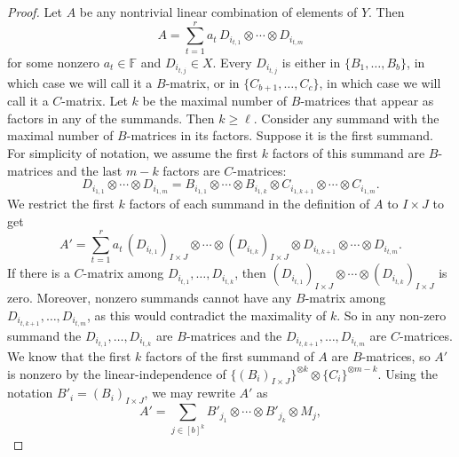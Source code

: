 \documentclass{daj}
\newcommand{\FF}{\mathbb{F}}
\begin{document}
%
%
%
%
%
%

%
\begin{proof}
    Let $A$ be any nontrivial linear combination of elements of $Y$.
    Then
    \[
    A=\sum_{t=1}^r a_t\, D_{i_{t,1}}\otimes\cdots\otimes D_{i_{t,m}}
    \]
    for some nonzero $a_t \in \FF$ and $D_{i_{t, j}} \in X$. Every $D_{i_{t, j}}$ is either in $\{B_1, \ldots, B_b\}$, in which case we will call it a $B$-matrix, or in $\{C_{b+1}, \ldots, C_c\}$, in which case we will call it a $C$-matrix.
    Let $k$ be the maximal number of $B$-matrices that appear as factors in any of the summands. Then $k\geq \ell$. 
    Consider any summand with the maximal number of $B$-matrices in its factors. Suppose it is the first summand. %
    For simplicity of notation, we assume the first $k$ factors of this summand are $B$-matrices and the last $m - k$ factors are $C$-matrices: %
    \[
    D_{i_{1,1}} \otimes \cdots \otimes D_{i_{1,m}}  = B_{i_{1,1}}\otimes\cdots\otimes B_{i_{1,k}}\otimes C_{i_{1,k+1}}\otimes\cdots\otimes C_{i_{1,m}}.
    \]
    We restrict the first $k$ factors of each summand in the definition of $A$ to $I\times J$ to get %
    \[
    A' = \sum_{t=1}^r a_t \, (D_{i_{t, 1}})_{I\times J} \otimes \cdots \otimes (D_{i_{t, k}})_{I\times J} \otimes D_{i_{t, k+1}} \otimes \cdots \otimes D_{i_{t, m}}.
    \]
    If there is a $C$-matrix among $D_{i_{t, 1}}, \ldots, D_{i_{t, k}}$, then $(D_{i_{t, 1}})_{I\times J} \otimes \cdots \otimes (D_{i_{t, k}})_{I\times J}$ is zero. 
    Moreover, nonzero summands cannot have any $B$-matrix among $D_{i_{t, k+1}}, \ldots, D_{i_{t, m}}$, as this would contradict the maximality of $k$. So in any non-zero summand the $D_{i_{t, 1}}, \ldots, D_{i_{t, k}}$ are $B$-matrices and the $D_{i_{t, k+1}}, \ldots, D_{i_{t, m}}$ are $C$-matrices. %
    We know that the first $k$ factors of the first summand of $A$ are $B$-matrices, so $A'$ is nonzero by the linear-independence of $\{(B_i)_{I\times J}\}^{\otimes k}\otimes\{C_i\}^{\otimes m-k}$.
%
%
%
    Using the notation $B'_i = (B_i)_{I\times J}$, we may rewrite $A'$ as
    \[
    A' = \sum_{{j}\in[b]^k}B'_{j_1}\otimes\cdots\otimes B'_{j_k}\otimes M_j,
\]
\end{proof}
\end{document}
